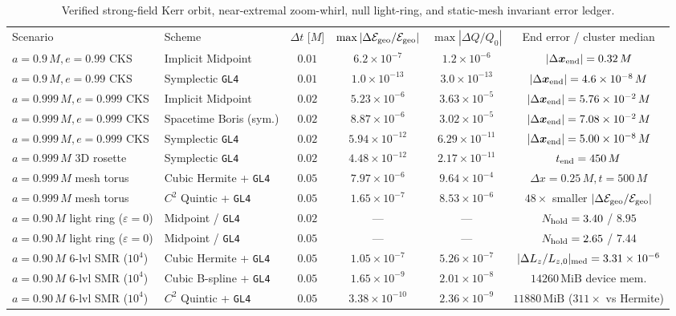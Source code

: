 \begin{table}[tbp]
\caption{\label{tab:bench_kerr_orbits}%
Verified strong-field Kerr orbit, near-extremal zoom-whirl, null light-ring, and static-mesh invariant error ledger.}
\scriptsize
\setlength{\tabcolsep}{3.5pt}
\begin{ruledtabular}
\begin{tabular}{llcccc}
Scenario & Scheme & $\Delta t$ [$M$] & $\max|\Delta\mathcal{E}_{\rm geo}/\mathcal{E}_{\rm geo}|$ & $\max|\Delta Q/Q_0|$ & End error / cluster median \\
\colrule
$a=0.9\,M, e=0.99$ CKS & Implicit Midpoint & $0.01$ & $6.2 \times 10^{-7}$ & $1.2 \times 10^{-6}$ & $|\Delta\bm{x}_{\rm end}| = 0.32\,M$ \\
$a=0.9\,M, e=0.99$ CKS & Symplectic \texttt{GL4} & $0.01$ & $1.0 \times 10^{-13}$ & $3.0 \times 10^{-13}$ & $|\Delta\bm{x}_{\rm end}| = 4.6 \times 10^{-8}\,M$ \\
$a=0.999\,M, e=0.999$ CKS & Implicit Midpoint & $0.02$ & $5.23 \times 10^{-6}$ & $3.63 \times 10^{-5}$ & $|\Delta\bm{x}_{\rm end}| = 5.76 \times 10^{-2}\,M$ \\
$a=0.999\,M, e=0.999$ CKS & Spacetime Boris (sym.) & $0.02$ & $8.87 \times 10^{-6}$ & $3.02 \times 10^{-5}$ & $|\Delta\bm{x}_{\rm end}| = 7.08 \times 10^{-2}\,M$ \\
$a=0.999\,M, e=0.999$ CKS & Symplectic \texttt{GL4} & $0.02$ & $5.94 \times 10^{-12}$ & $6.29 \times 10^{-11}$ & $|\Delta\bm{x}_{\rm end}| = 5.00 \times 10^{-8}\,M$ \\
$a=0.999\,M$ $3$D rosette & Symplectic \texttt{GL4} & $0.02$ & $4.48 \times 10^{-12}$ & $2.17 \times 10^{-11}$ & $t_{\rm end} = 450\,M$ \\
$a=0.999\,M$ mesh torus & Cubic Hermite + \texttt{GL4} & $0.05$ & $7.97 \times 10^{-6}$ & $9.64 \times 10^{-4}$ & $\Delta x = 0.25\,M, t = 500\,M$ \\
$a=0.999\,M$ mesh torus & $C^2$ Quintic + \texttt{GL4} & $0.05$ & $1.65 \times 10^{-7}$ & $8.53 \times 10^{-6}$ & $48\times$ smaller $|\Delta\mathcal{E}_{\rm geo}/\mathcal{E}_{\rm geo}|$ \\
$a=0.90\,M$ light ring ($\varepsilon=0$) & Midpoint / \texttt{GL4} & $0.02$ & --- & --- & $N_{\rm hold} = 3.40$ / $8.95$ \\
$a=0.90\,M$ light ring ($\varepsilon=0$) & Midpoint / \texttt{GL4} & $0.05$ & --- & --- & $N_{\rm hold} = 2.65$ / $7.44$ \\
$a=0.90\,M$ $6$-lvl SMR ($10^4$) & Cubic Hermite + \texttt{GL4} & $0.05$ & $1.05 \times 10^{-7}$ & $5.26 \times 10^{-7}$ & $|\Delta L_z/L_{z,0}|_{\rm med} = 3.31 \times 10^{-6}$ \\
$a=0.90\,M$ $6$-lvl SMR ($10^4$) & Cubic B-spline + \texttt{GL4} & $0.05$ & $1.65 \times 10^{-9}$ & $2.01 \times 10^{-8}$ & $14260\,\mathrm{MiB}$ device mem. \\
$a=0.90\,M$ $6$-lvl SMR ($10^4$) & $C^2$ Quintic + \texttt{GL4} & $0.05$ & $3.38 \times 10^{-10}$ & $2.36 \times 10^{-9}$ & $11880\,\mathrm{MiB}$ ($311\times$ vs Hermite) \\
\end{tabular}
\end{ruledtabular}
\end{table}

